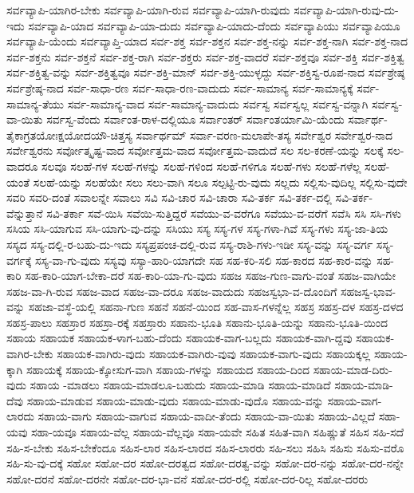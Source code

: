 {ಸರ್ವವ್ಯಾಪಿ-ಯಾಗಿರ-ಬೇಕು
ಸರ್ವವ್ಯಾಪಿ-ಯಾಗಿ-ರುವ
ಸರ್ವವ್ಯಾಪಿ-ಯಾಗಿ-ರುವುದು
ಸರ್ವವ್ಯಾಪಿ-ಯಾಗಿ-ರುವು-ದು-ಇದು
ಸರ್ವವ್ಯಾಪಿ-ಯಾದ
ಸರ್ವವ್ಯಾಪಿ-ಯಾ-ದುದು
ಸರ್ವವ್ಯಾಪಿ-ಯಾದು-ದೆಂದು
ಸರ್ವವ್ಯಾಪಿಯು
ಸರ್ವವ್ಯಾಪಿಯೂ
ಸರ್ವವ್ಯಾಪಿ-ಯೆಂದು
ಸರ್ವವ್ಯಾಪ್ತಿ-ಯಾದ
ಸರ್ವ-ಶಕ್ತ
ಸರ್ವ-ಶಕ್ತನ
ಸರ್ವ-ಶಕ್ತ-ನನ್ನು
ಸರ್ವ-ಶಕ್ತ-ನಾಗಿ
ಸರ್ವ-ಶಕ್ತ-ನಾದ
ಸರ್ವ-ಶಕ್ತನು
ಸರ್ವ-ಶಕ್ತನೆ
ಸರ್ವ-ಶಕ್ತ-ರಾಗಿ
ಸರ್ವ-ಶಕ್ತರು
ಸರ್ವ-ಶಕ್ತ-ವಾದರೆ
ಸರ್ವ-ಶಕ್ತವೂ
ಸರ್ವ-ಶಕ್ತಿ
ಸರ್ವ-ಶಕ್ತಿತ್ವ
ಸರ್ವ-ಶಕ್ತಿತ್ವ-ವನ್ನು
ಸರ್ವ-ಶಕ್ತಿತ್ವವೂ
ಸರ್ವ-ಶಕ್ತಿ-ಮಾನ್
ಸರ್ವ-ಶಕ್ತಿ-ಯುಳ್ಳದ್ದು
ಸರ್ವ-ಶಕ್ತಿಸ್ವ-ರೂಪ-ನಾದ
ಸರ್ವಶ್ರೇಷ್ಠ
ಸರ್ವಶ್ರೇಷ್ಠ-ನಾದ
ಸರ್ವ-ಸಾಧಾ-ರಣ
ಸರ್ವ-ಸಾಧಾ-ರಣ-ವಾದುದು
ಸರ್ವ-ಸಾಮಾನ್ಯ
ಸರ್ವ-ಸಾಮಾನ್ಯಕ್ಕೆ
ಸರ್ವ-ಸಾಮಾನ್ಯ-ತೆಯು
ಸರ್ವ-ಸಾಮಾನ್ಯ-ವಾದ
ಸರ್ವ-ಸಾಮಾನ್ಯ-ವಾದುದು
ಸರ್ವಸ್ವ
ಸರ್ವಸ್ವಲ್ಲ
ಸರ್ವಸ್ವ-ವನ್ನಾಗಿ
ಸರ್ವಸ್ವ-ವಾ-ಯಿತು
ಸರ್ವಸ್ವ-ವೆಂದು
ಸರ್ವಾಂತ-ರಾಳ-ದಲ್ಲಿಯೂ
ಸರ್ವಾಂತರ್
ಸರ್ವಾಂತರ್ಯಾಮಿ-ಯೆಂದು
ಸರ್ವಾರ್ಥ-ತೈಕಾಗ್ರತಯೋಃಕ್ಷಯೋದಯೌ-ಚಿತ್ತಸ್ಯ
ಸರ್ವಾರ್ಥಮ್
ಸರ್ವಾ-ವರಣ-ಮಲಾಪೇ-ತಸ್ಯ
ಸರ್ವೇಶ್ವರ
ಸರ್ವೇಶ್ವರ-ನಾದ
ಸರ್ವೇಶ್ವರನು
ಸರ್ವೋತ್ಕೃಷ್ಟ-ವಾದ
ಸರ್ವೋತ್ತಮ-ವಾದ
ಸರ್ವೋತ್ತಮ-ವಾದುದೆ
ಸಲ
ಸಲ-ಕರಣೆ-ಯನ್ನು
ಸಲಕ್ಕೆ
ಸಲ-ವಾದರೂ
ಸಲವೂ
ಸಲಹೆ-ಗಳ
ಸಲಹೆ-ಗಳನ್ನು
ಸಲಹೆ-ಗಳಿಂದ
ಸಲಹೆ-ಗಳಿಗೂ
ಸಲಹೆ-ಗಳು
ಸಲಹೆ-ಗಳೆಲ್ಲ
ಸಲಹೆ-ಯಂತೆ
ಸಲಹೆ-ಯನ್ನು
ಸಲಹೆಯೇ
ಸಲು
ಸಲು-ವಾಗಿ
ಸಲೂ
ಸಲ್ಪಟ್ಟಿ-ರು-ವುದು
ಸಲ್ಲದು
ಸಲ್ಲಿಸು-ವುದಿಲ್ಲ
ಸಲ್ಲಿಸು-ವುದೇ
ಸವರಿ
ಸವರಿ-ದಂತೆ
ಸವಾಲನ್ನೇ
ಸವಾಲು
ಸವಿ
ಸವಿ-ಚಾರ
ಸವಿ-ಚಾರಾ
ಸವಿ-ತರ್ಕ
ಸವಿ-ತರ್ಕ-ದಲ್ಲಿ
ಸವಿ-ತರ್ಕ-ವೆನ್ನುತ್ತಾನೆ
ಸವಿ-ತರ್ಕಾ
ಸವೆ-ಯಿಸಿ
ಸವೆಯಿ-ಸುತ್ತಿದ್ದರೆ
ಸವೆಯು-ವ-ವರೆಗೂ
ಸವೆಯು-ವ-ವರೆಗೆ
ಸವೆಸಿ
ಸಸಿ
ಸಸಿ-ಗಳು
ಸಸಿಯ
ಸಸಿ-ಯಾಗುವ
ಸಸಿ-ಯಾಗು-ವು-ದನ್ನು
ಸಸಿಯು
ಸಸ್ಯ
ಸಸ್ಯ-ಗಳ
ಸಸ್ಯ-ಗಳಾ-ಗಿವೆ
ಸಸ್ಯ-ಗಳು
ಸಸ್ಯ-ಜಾ-ತಿಯ
ಸಸ್ಯದ
ಸಸ್ಯ-ದಲ್ಲಿ-ರ-ಬಹು-ದು-ಇದು
ಸಸ್ಯಪ್ರಪಂಚ-ದಲ್ಲಿ-ರುವ
ಸಸ್ಯ-ರಾಶಿ-ಗಳು-ಇಡೀ
ಸಸ್ಯ-ವನ್ನು
ಸಸ್ಯ-ವರ್ಗ
ಸಸ್ಯ-ವರ್ಗಕ್ಕೆ
ಸಸ್ಯ-ವಾ-ಗು-ವುದು
ಸಸ್ಯವು
ಸಸ್ಯಾ-ಹಾರಿ-ಯಾಗದೇ
ಸಹ
ಸಹ-ಕರಿ-ಸಲಿ
ಸಹ-ಕಾರದ
ಸಹ-ಕಾರ-ವನ್ನು
ಸಹ-ಕಾರಿ
ಸಹ-ಕಾರಿ-ಯಾಗ-ಬೇಕಾ-ದರೆ
ಸಹ-ಕಾರಿ-ಯಾ-ಗು-ವುದು
ಸಹಜ
ಸಹಜ-ಗುಣ-ವಾಗು-ವಂತೆ
ಸಹಜ-ವಾಗಿಯೇ
ಸಹಜ-ವಾ-ಗಿ-ರುವ
ಸಹಜ-ವಾದ
ಸಹಜ-ವಾ-ದರೂ
ಸಹಜ-ವಾದುದು
ಸಹಜಸ್ವಭಾ-ವ-ದೊಂದಿಗೆ
ಸಹಜಸ್ವ-ಭಾವ-ವನ್ನು
ಸಹಜಾ-ವಸ್ಥೆ-ಯಲ್ಲಿ
ಸಹನಾ-ಗುಣ
ಸಹನೆ
ಸಹನೆ-ಯಿಂದ
ಸಹ-ವಾಸ-ಗಳನ್ನೆಲ್ಲ
ಸಹಸ್ರ
ಸಹಸ್ರ-ದಳ
ಸಹಸ್ರ-ದಳದ
ಸಹಸ್ರ-ಪಾಲು
ಸಹಸ್ರಾರ
ಸಹಸ್ರಾ-ರಕ್ಕೆ
ಸಹಸ್ರಾರು
ಸಹಾನು-ಭೂತಿ
ಸಹಾನು-ಭೂತಿ-ಯನ್ನು
ಸಹಾನು-ಭೂತಿ-ಯಿಂದ
ಸಹಾಯ
ಸಹಾಯಕ
ಸಹಾಯಕ-ಳಾಗ-ಬಹು-ದೆಂದು
ಸಹಾಯಕ-ವಾಗ-ಬಲ್ಲದು
ಸಹಾಯಕ-ವಾಗಿ-ದ್ದವು
ಸಹಾಯಕ-ವಾಗಿರ-ಬೇಕು
ಸಹಾಯಕ-ವಾಗಿರು-ವುದು
ಸಹಾಯಕ-ವಾಗಿರು-ವುವು
ಸಹಾಯಕ-ವಾಗು-ವುದು
ಸಹಾಯಕ್ಕಲ್ಲ
ಸಹಾಯ-ಕ್ಕಾಗಿ
ಸಹಾಯಕ್ಕೆ
ಸಹಾಯ-ಕ್ಕೋಸುಗ-ವಾಗಿ
ಸಹಾಯ-ಗಳನ್ನು
ಸಹಾಯದ
ಸಹಾಯ-ದಿಂದ
ಸಹಾಯ-ಮಾಡ-ದಿರು-ವುದು
ಸಹಾಯ	-ಮಾಡಲು
ಸಹಾಯ-ಮಾಡಲೂ-ಬಹುದು
ಸಹಾಯ-ಮಾಡಿ
ಸಹಾಯ-ಮಾಡಿದೆ
ಸಹಾಯ-ಮಾಡಿ-ದೆವು
ಸಹಾಯ-ಮಾಡುವ
ಸಹಾಯ-ಮಾಡು-ವುದು
ಸಹಾಯ-ಮಾಡು-ವುದೊ
ಸಹಾಯ-ವನ್ನು
ಸಹಾಯ-ವಾಗ-ಲಾರದು
ಸಹಾಯ-ವಾಗು
ಸಹಾಯ-ವಾಗುವ
ಸಹಾಯ-ವಾದೀ-ತೆಂದು
ಸಹಾಯ-ವಾ-ಯಿತು
ಸಹಾಯ-ವಿಲ್ಲದೆ
ಸಹಾ-ಯವು
ಸಹಾ-ಯವೂ
ಸಹಾಯ-ವೆಲ್ಲ
ಸಹಾಯ-ವೆಲ್ಲವೂ
ಸಹಾ-ಯವೇ
ಸಹಿತ
ಸಹಿತ-ವಾಗಿ
ಸಹಿಷ್ಣುತೆ
ಸಹಿಸ
ಸಹಿ-ಸದೆ
ಸಹಿ-ಸ-ಬೇಕು
ಸಹಿಸ-ಬೇಕೆಂದೂ
ಸಹಿಸ-ಲಾರ
ಸಹಿಸ-ಲಾರದ
ಸಹಿಸ-ಲಾರರು
ಸಹಿ-ಸಲು
ಸಹಿಸಿ
ಸಹಿಸು
ಸಹಿಸು-ವರೊ
ಸಹಿ-ಸು-ವು-ದಕ್ಕೆ
ಸಹೋ
ಸಹೋ-ದರ
ಸಹೋ-ದರತ್ವದ
ಸಹೋ-ದರತ್ವ-ವನ್ನು
ಸಹೋ-ದರ-ನನ್ನು
ಸಹೋ-ದರ-ನನ್ನೇ
ಸಹೋ-ದರನೆ
ಸಹೋ-ದರನೇ
ಸಹೋ-ದರ-ಭಾ-ವನೆ
ಸಹೋ-ದರ-ರಲ್ಲಿ
ಸಹೋ-ದರ-ರಿಲ್ಲ
ಸಹೋ-ದರರು
}
